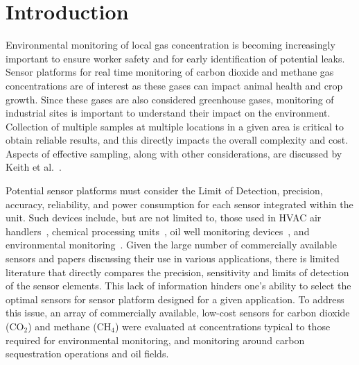 \documentclass[preprint,sort&compress]{elsarticle}
\begin{document}
	\newpage
	
	\section{Introduction}
	\label{sec:intro}
		
		Environmental monitoring of local gas concentration is becoming increasingly important to ensure worker safety and for early identification of potential leaks.
		Sensor platforms for real time monitoring of carbon dioxide and methane gas concentrations are of interest as these gases can impact animal health and crop growth.
		Since these gases are also considered greenhouse gases, monitoring of industrial sites is important to understand their impact on the environment.
		Collection of multiple samples at multiple locations in a given area is critical to obtain reliable results, and this directly impacts the overall complexity and cost.
		Aspects of effective sampling, along with other considerations, are discussed by Keith et al.~\cite{keith_principles_1983}.
		
		Potential sensor platforms must consider the Limit of Detection, precision, accuracy, reliability, and power consumption for each sensor integrated within the unit.
		Such devices include, but are not limited to, those used in HVAC air handlers~\cite{yang_systematic_2014,chung_selective_2008}, chemical processing units~\cite{won_nonlinear_2012}, oil well monitoring devices~\cite{yi_remote_2010,somov_deployment_2013}, and environmental monitoring~\cite{pering_high_2014,black_formation_2012,guohua_study_2012,karunanithi_performance_2009,shendell_outdoor_2012}.
		Given the large number of commercially available sensors and papers discussing their use in various applications, there is limited literature that directly compares the precision, sensitivity and limits of detection of the sensor elements.
		This lack of information hinders one's ability to select the optimal sensors for sensor platform designed for a given application.
		To address this issue, an array of commercially available, low-cost sensors for carbon dioxide (CO$_2$) and methane (CH$_4$) were evaluated at concentrations typical to those required for environmental monitoring, and monitoring around carbon sequestration operations and oil fields.
		
\end{document}
